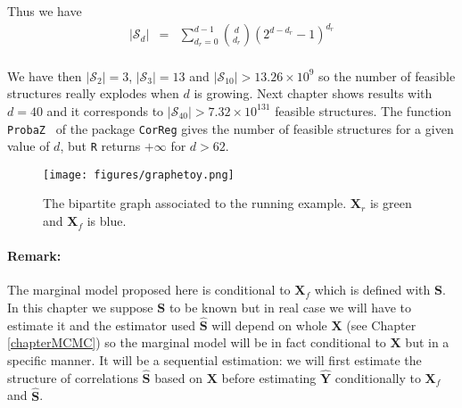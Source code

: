 \documentclass[12pt,a4paper]{report}
\begin{document}
			Thus we have
			\begin{eqnarray}
		|\mathcal{S}_d|&=&%
		 \sum_{d_r=0}^{d-1}{d \choose d_r}(2^{d-d_r}-1)^{d_r}
	\end{eqnarray}
	 \\
	We have then $|\mathcal{S}_2| =3 $, $|\mathcal{S}_3| =13 $ and $|\mathcal{S}_{10}| >13.26\times10^9 $ so the number of feasible structures really explodes when $d$ is growing. Next chapter shows results with $d=40$ and it corresponds to $|\mathcal{S}_{40}| >7.32\times10^{131} $ feasible structures. The function {\tt ProbaZ } of the package { \tt CorReg} gives the number of feasible structures for a given value of $d$, but {\tt R} returns $+\infty$ for $d>62$.\\

	\begin{figure}[h!]
	\centering
	\texttt{[image: figures/graphetoy.png]} 
	\caption{The bipartite graph associated to the running example. $\boldsymbol{X}_r$ is green and $\boldsymbol{X}_f$ is blue.}
	\end{figure}			
	
		\paragraph{Remark:} The marginal model proposed here is conditional to $\boldsymbol{X}_f$ which is defined with $\boldsymbol{S}$. In this chapter we suppose $\boldsymbol{S}$ to be known but in real case we will have to estimate it and the estimator used $\hat{\boldsymbol{S}}$ will depend on whole $\boldsymbol{X}$ (see Chapter \ref{chapterMCMC}) so the marginal model will be in fact conditional to $\boldsymbol{X}$ but in a specific manner. It will be a sequential estimation: we will first estimate the structure of correlations $\hat{\boldsymbol{S}}$ based on $\boldsymbol{X}$ before estimating $\hat{\boldsymbol{Y}}$ conditionally to $\boldsymbol{X}_f$ and $\hat{\boldsymbol{S}}$.
		
\end{document}
